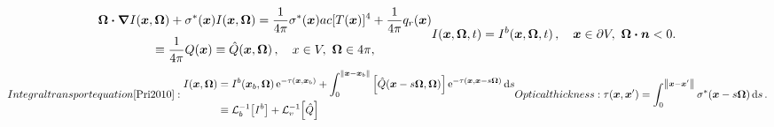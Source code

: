 \documentclass[draft]{beamer}
\begin{document}
\begin{frame}%
\begin{subequations} \label{eqs:fullTransport}
\begin{multline} \label{eq:fullTransportVol}
    \vec{\Omega}\vd \grad I(\vec{x}, \vec{\Omega})
    + \sigma^\ast(\vec{x}) I (\vec{x}, \vec{\Omega})
    = \frac{1}{4\pi} \sigma^\ast(\vec{x}) ac [T(\vec{x})]^4
    + \frac{1}{4\pi} q_{r}(\vec{x})
\\
    \equiv \frac{1}{4\pi} Q(\vec{x})
    \equiv \hat Q(\vec{x}, \vec{\Omega}) \,,
\quad
x \in V,\  \vec{\Omega} \in 4\pi,
\end{multline}
\begin{equation} \label{eq:fullTransportBndy}
  I(\vec{x}, \vec{\Omega}, t) = I^b(\vec{x}, \vec{\Omega}, t) \,,
 \quad \vec{x} \in \partial V, \ \vec{\Omega} \vd \vec{n} < 0.
\end{equation}
\end{subequations}
\begin{subequations} \label{eqs:inverseTransport}
Integral transport equation \cite{Pri2010}:
\begin{align} \label{eq:inverseTransportFull}
  I(\vec{x}, \vec{\Omega})
  &=
  I^b(\vec{x}_b, \vec{\Omega})
  \eexp^{ -\tau(\vec{x}, \vec{x}_b)}
  + \int_{0}^{\norm{\vec{x} - \vec{x}_b}}
  \left[ \hat Q(\vec{x} - s \vec{\Omega}, \vec{\Omega})
  \right]
  \eexp^{ -\tau(\vec{x}, \vec{x} - s \vec{\Omega})}
  \ud s
  \\ \label{eq:lopinv}
  &\equiv \lopinv{b}{I^b}
  + \lopinv{v}{\hat Q} 
\end{align}
Optical thickness: 
\begin{equation} \label{eq:fullTauDefinition}
  \tau(\vec{x}, \vec{x}') = \int_{0}^{\norm{\vec{x} -
  \vec{x}'}} \sigma^\ast(\vec{x}-s\vec{\Omega}) \ud s \,.
\end{equation}
\end{subequations}
\end{frame}
\end{document}
